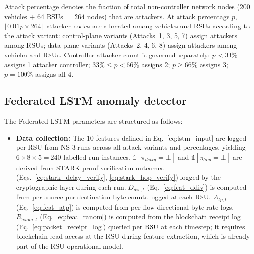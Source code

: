 \documentclass[12pt, a4paper]{report}
\begin{document}
{{\begin{itemize}
    Attack percentage denotes the fraction of total
non-controller network nodes (200 vehicles $+$
64 RSUs $= 264$ nodes) that are attackers.
At attack percentage $p$,
$\lfloor 0.01p \times 264 \rfloor$ attacker nodes
are allocated among vehicles and RSUs according
to the attack variant: control-plane variants
(Attacks~1, 3, 5, 7) assign attackers among RSUs;
data-plane variants (Attacks~2, 4, 6, 8) assign
attackers among vehicles and RSUs.
Controller attacker count is governed separately:
$p < 33\%$ assigns 1 attacker controller;
$33\% \leq p < 66\%$ assigns 2;
$p \geq 66\%$ assigns 3; $p = 100\%$ assigns all 4.

\end{itemize}

\subsection{Federated LSTM anomaly detector}
\label{sec:fed_lstm_params}
The Federated LSTM parameters are structured as follows:

\begin{itemize}
  \item \textbf{Data collection:}
The 10 features defined in
Eq.~\ref{eq:lstm_input} are logged per \ac{RSU}
from NS-3 runs across all attack variants and
percentages, yielding $6 \times 8 \times 5 = 240$
labelled run-instances.
$\mathbb{1}[\pi_{delay}{=}\bot]$ and
$\mathbb{1}[\pi_{hop}{=}\bot]$ are derived from
\ac{STARK} proof verification outcomes
(Eqs.~\ref{eq:stark_delay_verify},
\ref{eq:stark_hop_verify}) logged by the
cryptographic layer during each run.
$D_{div,t}$ (Eq.~\ref{eq:feat_ddiv}) is computed
from per-source per-destination byte counts logged
at each \ac{RSU}.
$A_{tp,t}$ (Eq.~\ref{eq:feat_atp}) is computed
from per-flow directional byte rate logs.
$R_{anom,t}$ (Eq.~\ref{eq:feat_ranom}) is computed
from the blockchain receipt log
(Eq.~\ref{eq:packet_receipt_log}) queried per
\ac{RSU} at each timestep; it requires blockchain
read access at the \ac{RSU} during feature
extraction, which is already part of the \ac{RSU}
operational model.


\end{itemize}}}
\end{document}
